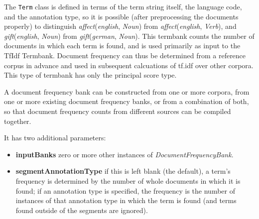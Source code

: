 The \texttt{Term} class is defined in terms of the term string itself, the
language code, and the annotation type, so it is possible (after preprocessing
the documents properly) to distinguish \emph{affect}(\emph{english}, \emph{Noun})
from \emph{affect}(\emph{english}, \emph{Verb}), and
\emph{gift}(\emph{english}, \emph{Noun}) from
\emph{gift}(\emph{german}, \emph{Noun}).
This termbank counts the number of documents in which each term is found, and is
used primarily as input to the TfIdf Termbank.  Document frequency can thus be
determined from a reference corpus in advance and used in subsequent calcuations
of tf.idf over other corpora.  This type of termbank has only the principal
score type.


A document frequency bank can be constructed from one or more corpora, from one
or more existing document frequency banks, or from a combination of both, so
that document frequency counts from different sources can be compiled together.

It has two additional parameters:
\begin{itemize}
\item \textbf{inputBanks} zero or more other instances of
  \emph{DocumentFrequencyBank}.
\item \textbf{segmentAnnotationType} if this is left blank (the default), a
  term's frequency is determined by the number of whole documents in which it is
  found; if an annotation type is specified, the frequency is the number of
  instances of that annotation type in which the term is found (and terms found
  outside of the segments are ignored).
\end{itemize}




